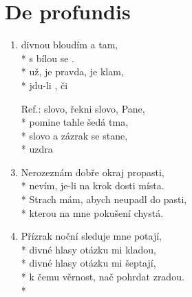 \section{De profundis}
\begin{enumerate}
\item {} divnou  bloudím  a tam, \\*
 s bílou  se .  \\*
 už,  je pravda,  je klam,  \\*
 jdu-li , či 
\item[Ref.:]  slovo, řekni slovo, Pane,\\*
 pomine tahle šedá tma,\\*
 slovo a zázrak se stane, \\*
uzdra   
\item Nerozeznám dobře okraj propasti,\\*
nevím, je-li na krok dosti místa.\\*
Strach mám, abych neupadl do pasti,\\*
kterou na mne pokušení chystá.
\item Přízrak noční sleduje mne potají,\\*
divné hlasy otázku mi kladou,\\*
divné hlasy otázku mi šeptají,\\*
k čemu věrnost, nač pohrdat zradou.\\*
\end{enumerate}
